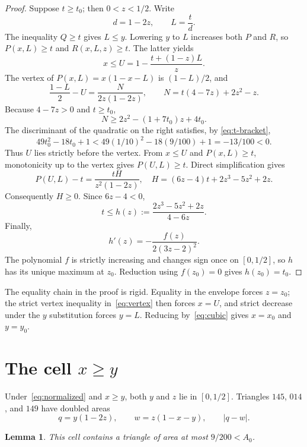 \documentclass[11pt]{amsart}
\newtheorem{lemma}[theorem]{Lemma}
\theoremstyle{definition}
\begin{document}
\begin{proof}
Suppose $t\ge t_0$; then $0<z<1/2$.  Write
\[
 d=1-2z,
 \qquad L=\frac{t}{d}.
\]
The inequality $Q\ge t$ gives $L\le y$.  Lowering $y$ to $L$ increases both
$P$ and $R$, so $P(x,L)\ge t$ and $R(x,L,z)\ge t$.  The latter yields
\[
 x\le U=1-\frac{t+(1-z)L}{z}.
\]
The vertex of $P(x,L)=x(1-x-L)$ is $(1-L)/2$, and
\begin{equation}\label{eq:vertex}
 \frac{1-L}{2}-U=
 \frac{N}{2z(1-2z)},\qquad N=t(4-7z)+2z^2-z.
\end{equation}
Because $4-7z>0$ and $t\ge t_0$,
\[
 N\ge 2z^2-(1+7t_0)z+4t_0.
\]
The discriminant of the quadratic on the right satisfies, by
\eqref{eq:t-bracket},
\[
49t_0^2-18t_0+1
<49(1/10)^2-18(9/100)+1=-13/100<0.
\]
Thus $U$ lies strictly before the vertex.  From $x\le U$ and
$P(x,L)\ge t$, monotonicity up to the vertex gives $P(U,L)\ge t$.
Direct simplification gives
\begin{equation}\label{eq:H}
 P(U,L)-t=\frac{tH}{z^2(1-2z)},\quad
 H=(6z-4)t+2z^3-5z^2+2z.
\end{equation}
Consequently $H\ge0$.  Since $6z-4<0$,
\begin{equation}\label{eq:envelope}
 t\le h(z):=\frac{2z^3-5z^2+2z}{4-6z}.
\end{equation}
Finally,
\[
 h'(z)=-\frac{f(z)}{2(3z-2)^2}.
\]
The polynomial $f$ is strictly increasing and changes sign once on
$[0,1/2]$, so $h$ has its unique maximum at $z_0$.  Reduction using
$f(z_0)=0$ gives $h(z_0)=t_0$.
\end{proof}

The equality chain in the proof is rigid.  Equality in the envelope forces
$z=z_0$; the strict vertex inequality in~\eqref{eq:vertex} then forces
$x=U$, and strict decrease under the $y$ substitution forces $y=L$.
Reducing by~\eqref{eq:cubic} gives $x=x_0$ and $y=y_0$.

\section{The cell \texorpdfstring{\(x\ge y\)}{x greater than or equal to y}}

Under~\eqref{eq:normalized} and $x\ge y$, both $y$ and $z$ lie in
$[0,1/2]$.  Triangles $145$, $014$, and $149$ have doubled areas
\begin{equation}\label{eq:product-witnesses}
 q=y(1-2z),\qquad w=z(1-x-y),\qquad |q-w|.
\end{equation}

\begin{lemma}\label{lem:reverse-order}
This cell contains a triangle of area at most $9/200<A_0$.
\end{lemma}
\end{document}
